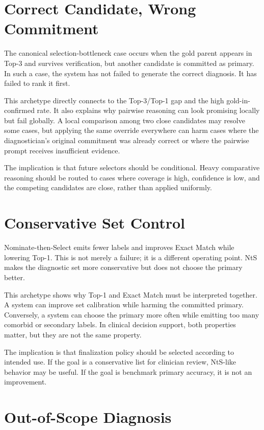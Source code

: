 \section{Correct Candidate, Wrong Commitment}

The canonical selection-bottleneck case occurs when the gold parent appears in Top-3 and survives verification, but another candidate is committed as primary. In such a case, the system has not failed to generate the correct diagnosis. It has failed to rank it first.

This archetype directly connects to the Top-3/Top-1 gap and the high gold-in-confirmed rate. It also explains why pairwise reasoning can look promising locally but fail globally. A local comparison among two close candidates may resolve some cases, but applying the same override everywhere can harm cases where the diagnostician's original commitment was already correct or where the pairwise prompt receives insufficient evidence.

The implication is that future selectors should be conditional. Heavy comparative reasoning should be routed to cases where coverage is high, confidence is low, and the competing candidates are close, rather than applied uniformly.

\section{Conservative Set Control}

Nominate-then-Select emits fewer labels and improves Exact Match while lowering Top-1. This is not merely a failure; it is a different operating point. NtS makes the diagnostic set more conservative but does not choose the primary better.

This archetype shows why Top-1 and Exact Match must be interpreted together. A system can improve set calibration while harming the committed primary. Conversely, a system can choose the primary more often while emitting too many comorbid or secondary labels. In clinical decision support, both properties matter, but they are not the same property.

The implication is that finalization policy should be selected according to intended use. If the goal is a conservative list for clinician review, NtS-like behavior may be useful. If the goal is benchmark primary accuracy, it is not an improvement.

\section{Out-of-Scope Diagnosis}

